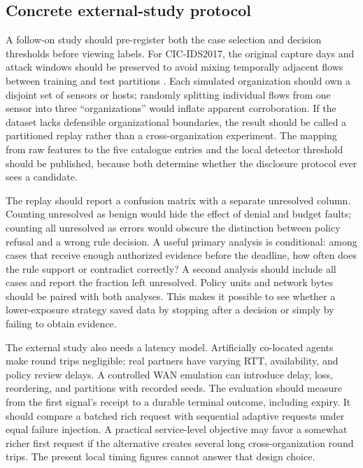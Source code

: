 \documentclass[conference,letterpaper]{IEEEtran}
\begin{document}
\subsection{Concrete external-study protocol}
A follow-on study should pre-register both the case selection and decision thresholds before viewing labels. For CIC-IDS2017, the original capture days and attack windows should be preserved to avoid mixing temporally adjacent flows between training and test partitions \cite{cicdata,cicpaper}. Each simulated organization should own a disjoint set of sensors or hosts; randomly splitting individual flows from one sensor into three ``organizations'' would inflate apparent corroboration. If the dataset lacks defensible organizational boundaries, the result should be called a partitioned replay rather than a cross-organization experiment. The mapping from raw features to the five catalogue entries and the local detector threshold should be published, because both determine whether the disclosure protocol ever sees a candidate.

The replay should report a confusion matrix with a separate unresolved column. Counting unresolved as benign would hide the effect of denial and budget faults; counting all unresolved as errors would obscure the distinction between policy refusal and a wrong rule decision. A useful primary analysis is conditional: among cases that receive enough authorized evidence before the deadline, how often does the rule support or contradict correctly? A second analysis should include all cases and report the fraction left unresolved. Policy units and network bytes should be paired with both analyses. This makes it possible to see whether a lower-exposure strategy saved data by stopping after a decision or simply by failing to obtain evidence.

The external study also needs a latency model. Artificially co-located agents make round trips negligible; real partners have varying RTT, availability, and policy review delays. A controlled WAN emulation can introduce delay, loss, reordering, and partitions with recorded seeds. The evaluation should measure from the first signal's receipt to a durable terminal outcome, including expiry. It should compare a batched rich request with sequential adaptive requests under equal failure injection. A practical service-level objective may favor a somewhat richer first request if the alternative creates several long cross-organization round trips. The present local timing figures cannot answer that design choice.
\end{document}
